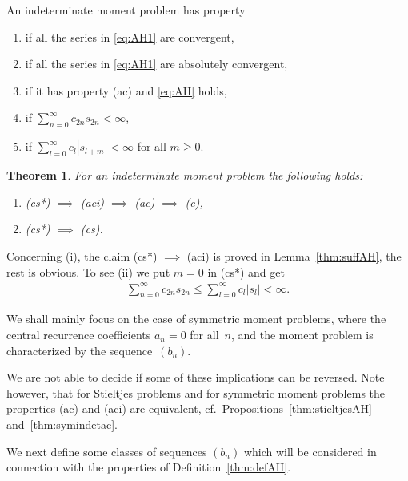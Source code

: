 \documentclass[pdftex]{sigma}
\numberwithin{equation}{section}
\newtheorem{thm}{Theorem}[section]
\begin{document}
\begin{defn}\label{thm:defAH} An indeterminate moment problem has property
\begin{enumerate}\itemsep=0pt
\item[{\rm (c)}] if all the series in \eqref{eq:AH1} are convergent,
\item[{\rm (ac)}] if all the series in \eqref{eq:AH1} are absolutely convergent,
\item[{\rm (aci)}] if it has property {\rm (ac)} and \eqref{eq:AH} holds,
\item[{\rm (cs)}] if $\sum\limits_{n=0}^\infty c_{2n}s_{2n}<\infty$,
\item[{\rm (cs*)}] if $\sum\limits_{l=0}^\infty c_l|s_{l+m}|<\infty$ for all $m\ge 0$.
\end{enumerate}
\end{defn}

\begin{thm}\label{thm:start} For an indeterminate moment problem the following holds:
\begin{enumerate}\itemsep=0pt
\item[{\rm (i)}] {\rm (cs*)} $\implies$ {\rm (aci)} $\implies$ {\rm (ac)} $\implies$ {\rm (c)},
\item[{\rm (ii)}] {\rm (cs*)} $\implies$ {\rm (cs)}.
\end{enumerate}
\end{thm}

Concerning (i), the claim (cs*) $\implies$ (aci) is proved in Lemma~\ref{thm:suffAH}, the rest is obvious. To see (ii) we put $m=0$ in (cs*) and get
\begin{gather*}
\sum_{n=0}^\infty c_{2n}s_{2n}\le\sum_{l=0}^\infty c_l|s_l|<\infty.
\end{gather*}

We shall mainly focus on the case of symmetric moment problems, where the central recurrence coefficients $a_n=0$ for all~$n$, and the moment problem is characterized by the sequence~$(b_n)$.

\begin{rem}\label{thm:notreverse} We are not able to decide if some of these implications can be reversed. Note however, that for Stieltjes problems and for symmetric moment problems the properties (ac) and (aci) are equivalent, cf.\ Propositions~\ref{thm:stieltjesAH} and~\ref{thm:symindetac}.
\end{rem}

We next define some classes of sequences $(b_n)$ which will be considered in connection with the properties of Definition~\ref{thm:defAH}.
\end{document}
